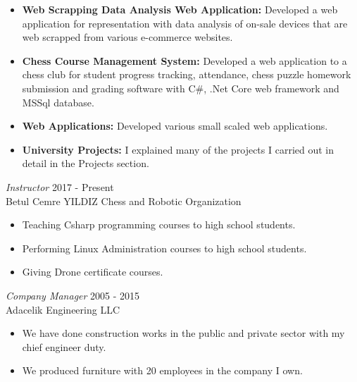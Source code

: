\documentclass[line,margin]{res}
\begin{document}
\begin{resume}
\begin{itemize}
\begin{itemize}
                         \end{itemize}
                 \item \textbf{Web Scrapping Data Analysis Web Application: } Developed a web application for representation with data analysis of on-sale devices that are web scrapped from various e-commerce websites. 
                 \item \textbf{Chess Course Management System: } Developed a web application to a chess club for student progress tracking, attendance, chess puzzle homework submission and grading software with C\#, .Net Core web framework and MSSql database. 
                \item \textbf{Web Applications: } Developed various small scaled web applications.
                \item \textbf{University Projects: } I explained many of the projects I carried out in detail in the Projects section.
                \end{itemize}
 
                {\sl  Instructor} \hfill             2017 - Present \\
                Betul Cemre YILDIZ Chess and Robotic Organization
                 \begin{itemize}  \itemsep -2pt %
                 \item Teaching Csharp programming courses to high school students.
                 \item Performing  Linux Administration courses to high school students.
                 \item Giving Drone certificate courses.
                 \end{itemize} 

                 
                {\sl Company Manager} \hfill        2005 - 2015 \\
                Adacelik Engineering LLC
                  \begin{itemize}
                   \item We have done construction works in the public and private sector with my chief engineer duty.
                     
                   \item We produced furniture with 20 employees in the company I own.
                   \end{itemize} 


\end{resume}
\end{document}
